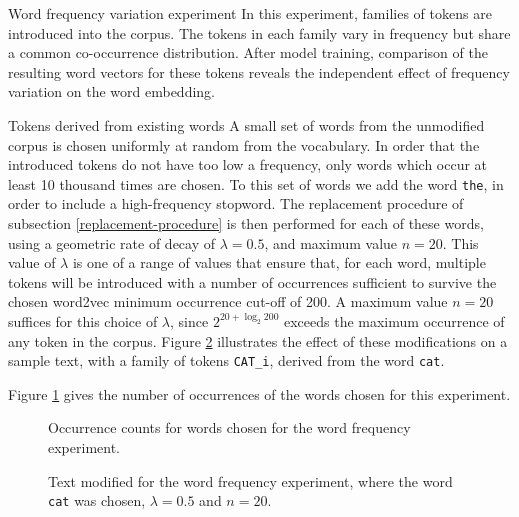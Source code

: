 \documentclass{article} %
\newcommand{\word}[1]{\texttt{#1}}
\begin{document}
\begin{section}{Word frequency variation experiment}\label{WFVE}
In this experiment, families of tokens are introduced into the corpus.
The tokens in each family vary in frequency but share a common co-occurrence distribution.
After model training, comparison of the resulting word vectors for these tokens reveals the independent effect of frequency variation on the word embedding.

\begin{subsection}{Tokens derived from existing words}
A small set of words from the unmodified corpus is chosen uniformly at random from the vocabulary.
In order that the introduced tokens do not have too low a frequency, only words which occur at least 10 thousand times are chosen.
To this set of words we add the word \word{the}, in order to include a high-frequency stopword.
The replacement procedure of subsection \ref{replacement-procedure} is then performed for each of these words, using a geometric rate of decay of $\lambda = 0.5$, and maximum value $n=20$.
This value of $\lambda$ is one of a range of values that ensure that, for each word, multiple tokens will be introduced with a number of occurrences sufficient to survive the chosen word2vec minimum occurrence cut-off of 200.  
A maximum value $n=20$ suffices for this choice of $\lambda$, since $2^{20 + \log_2{200}}$ exceeds the maximum occurrence of any token in the corpus. 
Figure \ref{fig:word-frequency-experiment-text-cat} illustrates the effect of these modifications on a sample text, with a family of tokens \word{CAT\_i}, derived from the word \word{cat}.

Figure \ref{fig:word-frequency-counts} gives the number of occurrences of the words chosen for this experiment.

\begin{figure}\label{fig:word-frequency-counts}
	
	\caption{Occurrence counts for words chosen for the word frequency experiment. }
\end{figure}

\begin{figure}
	
	\caption{Text modified for the word frequency experiment, where the word \word{cat} was chosen, $\lambda=0.5$ and $n=20$.}
	\label{fig:word-frequency-experiment-text-cat}
\end{figure}

\end{subsection}


\end{section}
\end{document}
